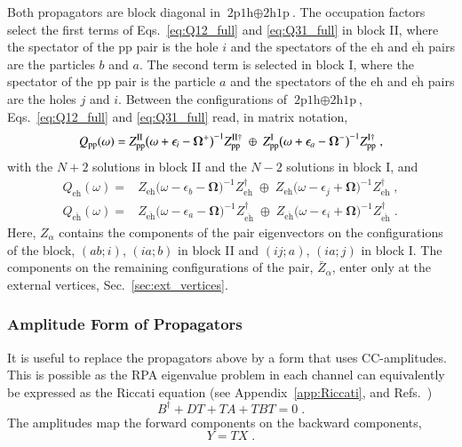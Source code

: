 \documentclass[aip,jcp,reprint,noshowkeys,superscriptaddress]{revtex4-1}
\newcommand{\eps}{\epsilon}
\newcommand{\hhp}{\text{2h1p}}
\newcommand{\pph}{\text{2p1h}}
\newcommand{\eh}{\text{eh}}
\newcommand{\teh}{\overline{\text{eh}}}
\newcommand{\pp}{\text{pp}}
\begin{document}
Both propagators are block diagonal in $\pph\oplus\hhp$. The occupation
factors select the first terms of Eqs.~\eqref{eq:Q12_full} and
\eqref{eq:Q31_full} in block II, where the spectator of the $\pp$ pair is
the hole $i$ and the spectators of the $\eh$ and $\teh$ pairs are the
particles $b$ and $a$. The second term is selected in block I, where the
spectator of the $\pp$ pair is the particle $a$ and the spectators of the
$\eh$ and $\teh$ pairs are the holes $j$ and $i$. Between the
configurations of $\pph\oplus\hhp$, Eqs.~\eqref{eq:Q12_full} and
\eqref{eq:Q31_full} read, in matrix notation,
\begin{equation}
Q_{\pp}(\omega)
=
Z^{\rm II}_{\pp}\big(\omega+\eps_i-\boldsymbol\Omega^{+}\big)^{-1}Z^{{\rm II}\dagger}_{\pp}
\;\oplus\;
Z^{\rm I}_{\pp}\big(\omega+\eps_a-\boldsymbol\Omega^{-}\big)^{-1}Z^{{\rm I}\dagger}_{\pp} \;,
\label{eq:Q12}
\end{equation}
with the $N+2$ solutions in block II and the $N-2$ solutions in block I, and
\begin{equation}
\begin{aligned}
Q_{\eh}(\omega)
={}&
Z_{\eh}\big(\omega-\eps_b-\boldsymbol\Omega\big)^{-1}Z_{\eh}^{\dagger}
\;\oplus\;
Z_{\eh}\big(\omega-\eps_j+\boldsymbol\Omega\big)^{-1}Z_{\eh}^{\dagger} \;,
\\
Q_{\teh}(\omega)
={}&
Z_{\teh}\big(\omega-\eps_a-\boldsymbol\Omega\big)^{-1}Z_{\teh}^{\dagger}
\;\oplus\;
Z_{\teh}\big(\omega-\eps_i+\boldsymbol\Omega\big)^{-1}Z_{\teh}^{\dagger} \;.
\end{aligned}
\label{eq:Q31}
\end{equation}
Here, $Z_\alpha$ contains the components of the pair eigenvectors on the
configurations of the block, $(ab;i)$, $(ia;b)$ in block II and $(ij;a)$,
$(ia;j)$ in block I. The components on the remaining configurations of
the pair, $\bar Z_\alpha$, enter only at the external vertices,
Sec.~\ref{sec:ext_vertices}.

\subsubsection{Amplitude Form of Propagators}
It is useful to replace the propagators above by a form
that uses CC-amplitudes. This is possible as
the RPA eigenvalue problem in each channel
can equivalently be expressed as
the Riccati equation (see Appendix~\ref{app:Riccati}, and
Refs.~)
\begin{equation}
B^\dagger+DT+TA
+TBT
=0 \;.
\label{eq:Riccati}
\end{equation}
The amplitudes map the forward components on the backward components,
\begin{equation}
Y
=
T X \;.
\label{eq:T_YX}
\end{equation}
\end{document}
